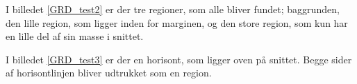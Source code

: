 I billedet \ref{GRD_test2} er der tre regioner, som
alle bliver fundet; baggrunden, den lille region, som ligger inden for
marginen, og den store region, som kun har en lille del af sin masse
i snittet. 

\begin{figure}[!h]
    \centering
    	\hspace{1em}
		\hspace{1em}
        \caption[]{}
     \label{GRD_test2_sammen}
\end{figure}

I billedet \ref{GRD_test3} er der en horisont, som ligger oven på
snittet. Begge sider af horisontlinjen bliver udtrukket som en region.

